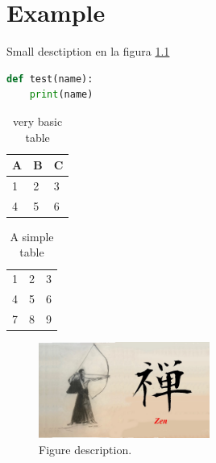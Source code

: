 \chapter{Example}
Small desctiption \cite{lehman2006biblatex} en la figura \ref{figura1}

\begin{lstlisting}[language=python,caption={Python example}]
def test(name):
	print(name)
\end{lstlisting}
\begin{table}[h]
	\centering
	\begin{tabular}{l | l | l}
		A & B & C \\
		\hline
		1 & 2 & 3 \\
		4 & 5 & 6
	\end{tabular}
	\caption{very basic table}
	\label{tab:abc}
\end{table}

\begin{table}[h]
	\centering
	\begin{tabular}{| l c r |}
		\hline
		1 & 2 & 3 \\
		4 & 5 & 6 \\
		7 & 8 & 9 \\
		\hline
	\end{tabular}
	\caption{A simple table}
\end{table}


\begin{figure}[h]
	
	\centering
	
	\includegraphics[width=0.5\textwidth]{image/cover.jpg}
	
	\caption{Figure description.}
	
	\label{figura1}
	
\end{figure}